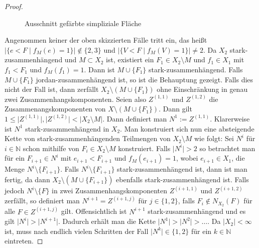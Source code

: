 \documentclass[12pt,titlepage]{article}
\begin{document}
\begin{proof}
\begin{figure}[H]
\caption{Ausschnitt gefärbte simpliziale Fläche}
\end{figure}
Angenommen keiner der oben skizzierten Fälle tritt ein, das heißt $ \vert\{e <F \mid f_M(e)=1\}\vert \notin \{2,3\}$ und $\vert \{V<F \mid f_M(V)=1\}\vert \neq 2$. Da $X_2$ stark-zusammenhängend und $M \subset X_2$ ist, existiert ein $F_1\in X_2\setminus M$ und $f_1 \in X_1$ mit $f_1<F_1$ und $f_M(f_1)=1$. Dann ist $M \cup \{F_1\}$ stark-zusammenhängend. Falls $M \cup \{F_1\}$ jordan-zusammenhängend ist, so ist die Behauptung gezeigt. Falls dies nicht der Fall ist, dann zerfällt $X_2 \setminus (M \cup \{F_1\})$  ohne Einschränkung in genau zwei  Zusammenhangskomponenten. Seien also $Z^{(1,1)}$ und $Z^{(1,2)}$ die Zusammenangskomponenten von $X\setminus (M \cup \{F_1\})$. Dann gilt $1\leq \vert Z^{(1,1)}\vert,\vert Z^{(1,2)}\vert < \vert X_2\setminus M\vert$. Dann definiert man $N^1:=Z^{(1,1)}$. Klarerweise ist $N^1$ stark-zusammenhängend in $X_2$. Man konstruiert sich nun eine absteigende Kette von stark-zusammenhängenden Teilmengen von $X_2\setminus M$  wie folgt:
Sei $N^i$ für $i \in \mathbb{N}$ schon mithilfe von $F_i\in X_2\setminus M$ konstruiert. Falls  $\vert N^i \vert>2$ so betrachtet man für ein $F_{i+1}\in N^i$ mit $e_{i+1}<F_{i+1}$ und $f_M(e_{i+1})=1$, wobei $e_{i+1} \in X_1$, die Menge $N^i\setminus \{F_{i+1}\}$. 
Falls $N^i \setminus \{F_{i+1}\}$ stark-zusammenhängend ist, dann ist man fertig, da dann $X_2\setminus (M \cup \{F_{i+1}\})$ ebenfalls stark-zusammenhängend ist.
 Falls jedoch $N^i \setminus \{F\}$ in zwei Zusammenhangskomponenten $Z^{(i+1,1)}$ und $Z^{(i+1,2)}$ zerfällt, so definiert man $N^{i+1}=Z^{(i+1,j)}$  für $j \in \{1,2\}$, falls $F_{i} \notin N_{X_2}(F)$ für  alle $F \in Z^{(i+1,j)}$ gilt. Offensichtlich ist $N^{i+1}$ stark-zusammenhängend und es gilt $\vert N^{i}\vert >\vert N^{i+1} \vert$. Dadurch erhält man die Kette $\vert N^1 \vert>\vert  N^2 \vert> \ldots$. Da $\vert X_2\vert < \infty$ ist, muss nach endlich vielen Schritten der Fall $\vert N^k \vert \in \{1,2\}$ für ein $k \in \mathbb{N}$ eintreten.

\end{proof}
\end{document}
